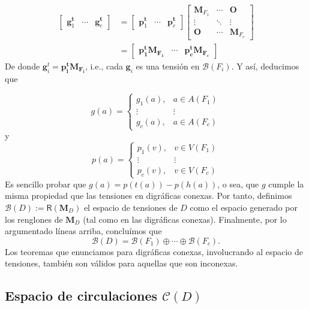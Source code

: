 \begin{align*}
    \begin{bmatrix}
\mathbf{g}_{1}^{\mathbf{t}} & \cdots  & \mathbf{g}_{c}^{\mathbf{t}} 
\end{bmatrix} &= \begin{bmatrix}
\mathbf{p}_{1}^{\mathbf{t}} & \cdots  & \mathbf{p}_{c}^{\mathbf{t}} 
\end{bmatrix} \begin{bmatrix}
\mathbf{M}_{F_{1}} & \cdots  & \mathbf{O} \\ 
\vdots & \ddots  & \vdots \\ 
\mathbf{O} & \cdots & \mathbf{M}_{F_{c}}
\end{bmatrix}\\ &= \begin{bmatrix}
 \mathbf{p_{1}^{t}M_{F_{1}}} & \cdots &  \mathbf{p_{c}^{t}M_{F_{c}}}
\end{bmatrix}
\end{align*}
De donde $\mathbf{g}_{i}^{t} = \mathbf{p_{i}^{t}M_{F_{i}}}$, i.e., cada $\mathbf{g}_{i}$ es una tensión en $\mathcal{B}(F_{i})$. Y así, deducimos que

$$
g(a) = \left\{\begin{matrix}
g_{1}(a), & a \in A(F_{1})\\ 
\vdots & \vdots \\ 
g_{c}(a), & a \in A(F_{c})
\end{matrix}\right.
$$
y
$$
p(a) = \left\{\begin{matrix}
p_{1}(v), & v \in V(F_{1})\\ 
\vdots & \vdots \\ 
p_{c}(v), & v \in V(F_{c})
\end{matrix}\right.
$$
Es sencillo probar que $g(a) = p(t(a)) - p(h(a))$, o sea, que $g$ cumple la misma propiedad que las tensiones en digráficas conexas. Por tanto, definimos $\mathcal{B}(D):=\mathsf{R}(\mathbf{M}_{D})$ el espacio de tensiones de $D$ como el espacio generado por los renglones de $\mathbf{M}_{D}$ (tal como en las digráficas conexas). Finalmente, por lo argumentado líneas arriba, concluímos que
$$
\mathcal{B}(D) = \mathcal{B}(F_{1}) \oplus \cdots \oplus \mathcal{B}(F_{c}).
$$
Los teoremas que enunciamos para digráficas conexas, involucrando al espacio de tensiones, también son válidos para aquellas que son inconexas.


\subsection{Espacio de circulaciones $\mathcal{C}(D)$}

